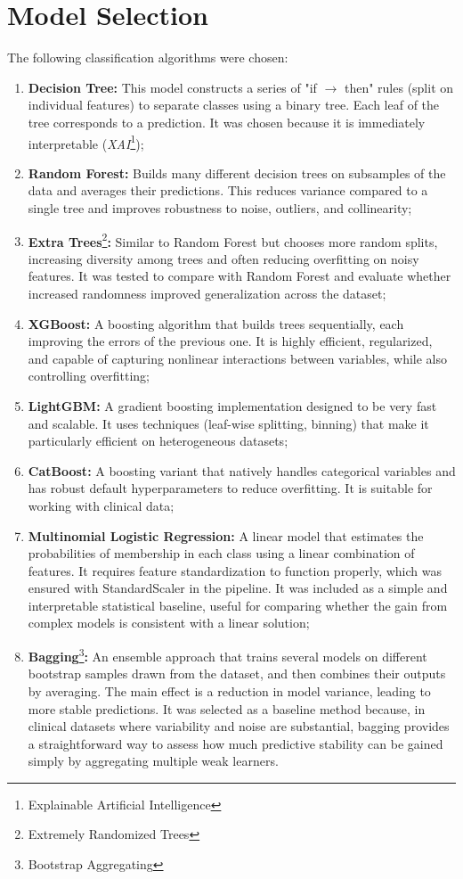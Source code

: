 \section{Model Selection}
The following classification algorithms were chosen:
\begin{enumerate}
	\item \textbf{Decision Tree:} This model constructs a series of "if $\to$ then" rules (split on individual features) to separate classes using a binary tree. Each leaf of the tree corresponds to a prediction. It was chosen because it is immediately interpretable (\textit{XAI}\footnote{Explainable Artificial Intelligence});
	\item \textbf{Random Forest:} Builds many different decision trees on subsamples of the data and averages their predictions. This reduces variance compared to a single tree and improves robustness to noise, outliers, and collinearity;
	\item \textbf{Extra Trees}\footnote{Extremely Randomized Trees}\textbf{:} Similar to Random Forest but chooses more random splits, increasing diversity among trees and often reducing overfitting on noisy features. It was tested to compare with Random Forest and evaluate whether increased randomness improved generalization across the dataset;
	\item \textbf{XGBoost:} A boosting algorithm that builds trees sequentially, each improving the errors of the previous one. It is highly efficient, regularized, and capable of capturing nonlinear interactions between variables, while also controlling overfitting;
	\item \textbf{LightGBM:} A gradient boosting implementation designed to be very fast and scalable. It uses techniques (leaf-wise splitting, binning) that make it particularly efficient on heterogeneous datasets;
	\item \textbf{CatBoost:} A boosting variant that natively handles categorical variables and has robust default hyperparameters to reduce overfitting. It is suitable for working with clinical data;
	\item \textbf{Multinomial Logistic Regression:} A linear model that estimates the probabilities of membership in each class using a linear combination of features. It requires feature standardization to function properly, which was ensured with StandardScaler in the pipeline. It was included as a simple and interpretable statistical baseline, useful for comparing whether the gain from complex models is consistent with a linear solution;
	\item \textbf{Bagging}\footnote{Bootstrap Aggregating}\textbf{:} An ensemble approach that trains several models on different bootstrap samples drawn from the dataset, and then combines their outputs by averaging. The main effect is a reduction in model variance, leading to more stable predictions. It was selected as a baseline method because, in clinical datasets where variability and noise are substantial, bagging provides a straightforward way to assess how much predictive stability can be gained simply by aggregating multiple weak learners.
\end{enumerate}